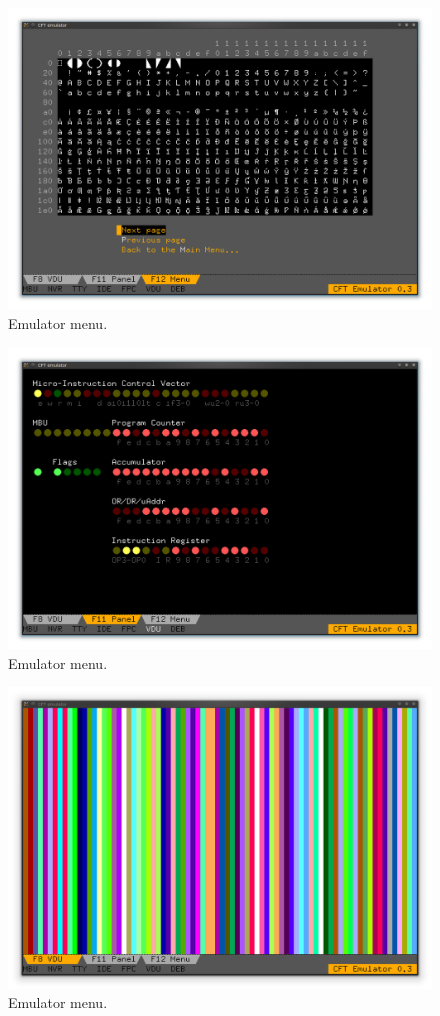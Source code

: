 \begin{figure}
  \centering
  \includegraphics[width=0.9\columnwidth]{../figs/emulator-tab-menu-3.png}
  \caption{\label{fig:vdu:impractical-modes}Emulator menu.}
\end{figure}

\begin{figure}
  \centering
  \includegraphics[width=0.9\columnwidth]{../figs/emulator-tab-panel-1.png}
  \caption{\label{fig:vdu:impractical-modes}Emulator menu.}
\end{figure}

\begin{figure}
  \centering
  \includegraphics[width=0.9\columnwidth]{../figs/emulator-tab-vdu-1.png}
  \caption{\label{fig:vdu:impractical-modes}Emulator menu.}
\end{figure}


